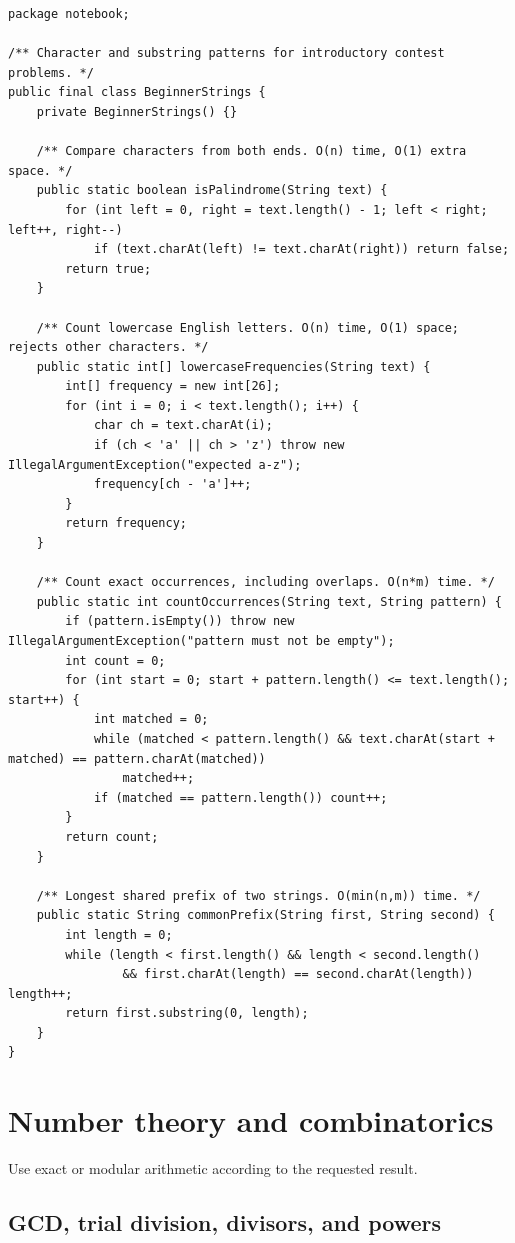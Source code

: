 \documentclass[10pt,letterpaper]{article}
\begin{document}
\begin{lstlisting}
package notebook;

/** Character and substring patterns for introductory contest problems. */
public final class BeginnerStrings {
    private BeginnerStrings() {}

    /** Compare characters from both ends. O(n) time, O(1) extra space. */
    public static boolean isPalindrome(String text) {
        for (int left = 0, right = text.length() - 1; left < right; left++, right--)
            if (text.charAt(left) != text.charAt(right)) return false;
        return true;
    }

    /** Count lowercase English letters. O(n) time, O(1) space; rejects other characters. */
    public static int[] lowercaseFrequencies(String text) {
        int[] frequency = new int[26];
        for (int i = 0; i < text.length(); i++) {
            char ch = text.charAt(i);
            if (ch < 'a' || ch > 'z') throw new IllegalArgumentException("expected a-z");
            frequency[ch - 'a']++;
        }
        return frequency;
    }

    /** Count exact occurrences, including overlaps. O(n*m) time. */
    public static int countOccurrences(String text, String pattern) {
        if (pattern.isEmpty()) throw new IllegalArgumentException("pattern must not be empty");
        int count = 0;
        for (int start = 0; start + pattern.length() <= text.length(); start++) {
            int matched = 0;
            while (matched < pattern.length() && text.charAt(start + matched) == pattern.charAt(matched))
                matched++;
            if (matched == pattern.length()) count++;
        }
        return count;
    }

    /** Longest shared prefix of two strings. O(min(n,m)) time. */
    public static String commonPrefix(String first, String second) {
        int length = 0;
        while (length < first.length() && length < second.length()
                && first.charAt(length) == second.charAt(length)) length++;
        return first.substring(0, length);
    }
}
\end{lstlisting}
\section{Number theory and combinatorics}
\begin{guidebox}Use exact or modular arithmetic according to the requested result.\end{guidebox}
\subsection{GCD, trial division, divisors, and powers}
\end{document}
